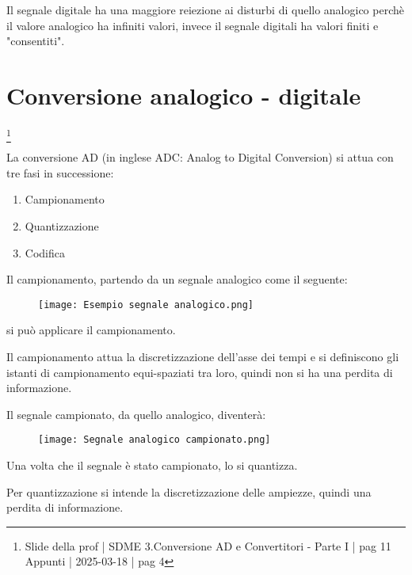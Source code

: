 Il segnale digitale ha una maggiore reiezione ai disturbi di quello analogico perchè 
il valore analogico ha infiniti valori, invece il segnale digitali ha valori finiti e "consentiti". \newline 

\newpage 

\section{Conversione analogico - digitale}
\footnote{Slide della prof | SDME 3.Conversione AD e Convertitori - Parte I | pag 11 \\  
Appunti | 2025-03-18 | pag 4}

La conversione AD (in inglese ADC: Analog to Digital Conversion) si attua con tre fasi in successione: 

\begin{enumerate}
    \item Campionamento 
    \item Quantizzazione 
    \item Codifica
\end{enumerate}

Il campionamento, partendo da un segnale analogico come il seguente: 

\begin{figure}[h]
    \centering
    \texttt{[image: Esempio segnale analogico.png]}
\end{figure}

si può applicare il campionamento. \newline 

Il campionamento attua la discretizzazione dell'asse dei tempi e si definiscono gli istanti di campionamento equi-spaziati tra loro, quindi non si ha una perdita di informazione. \newline 

Il segnale campionato, da quello analogico, diventerà: 

\begin{figure}[h]
    \centering
    \texttt{[image: Segnale analogico campionato.png]}
\end{figure}


Una volta che il segnale è stato campionato, lo si quantizza. \newline 

Per quantizzazione si intende la discretizzazione delle ampiezze, quindi una perdita di informazione. \newline 

